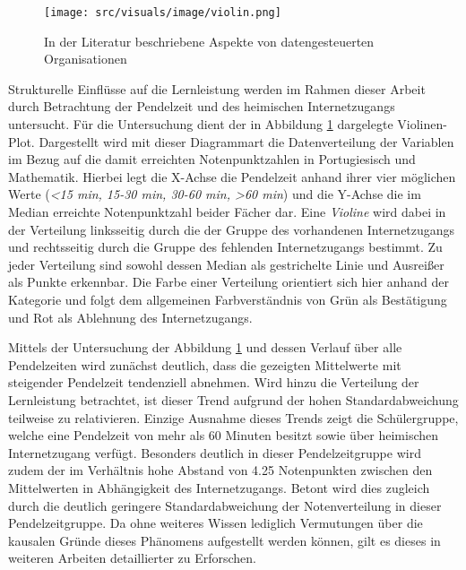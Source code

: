 \begin{figure}[htb]
    \centering
    \texttt{[image: src/visuals/image/violin.png]}
    \caption{In der Literatur beschriebene Aspekte von datengesteuerten Organisationen}
    \label{fig:violin}
\end{figure}

Strukturelle Einflüsse auf die Lernleistung werden im Rahmen dieser Arbeit durch Betrachtung der Pendelzeit und des heimischen Internetzugangs untersucht.
Für die Untersuchung dient der in Abbildung \ref{fig:violin} dargelegte Violinen-Plot.
Dargestellt wird mit dieser Diagrammart die Datenverteilung der Variablen im Bezug auf die damit erreichten Notenpunktzahlen in Portugiesisch und Mathematik.
Hierbei legt die X-Achse die Pendelzeit anhand ihrer vier möglichen Werte (\textit{<15 min, 15-30 min, 30-60 min, >60 min}) und die Y-Achse die im Median erreichte Notenpunktzahl beider Fächer dar.
Eine \textit{Violine} wird dabei in der Verteilung linksseitig durch die der Gruppe des vorhandenen Internetzugangs und rechtsseitig durch die Gruppe des fehlenden Internetzugangs bestimmt.
Zu jeder Verteilung sind sowohl dessen Median als gestrichelte Linie und Ausreißer als Punkte erkennbar.
Die Farbe einer Verteilung orientiert sich hier anhand der Kategorie und folgt dem allgemeinen Farbverständnis von Grün als Bestätigung und Rot als Ablehnung des Internetzugangs.

Mittels der Untersuchung der Abbildung \ref{fig:violin} und dessen Verlauf über alle Pendelzeiten wird zunächst deutlich, dass die gezeigten Mittelwerte mit steigender Pendelzeit tendenziell abnehmen. 
Wird hinzu die Verteilung der Lernleistung betrachtet, ist dieser Trend aufgrund der hohen Standardabweichung teilweise zu relativieren.
Einzige Ausnahme dieses Trends zeigt die Schülergruppe, welche eine Pendelzeit von mehr als 60 Minuten besitzt sowie über heimischen Internetzugang verfügt.
Besonders deutlich in dieser Pendelzeitgruppe wird zudem der im Verhältnis hohe Abstand von 4.25 Notenpunkten zwischen den Mittelwerten in Abhängigkeit des Internetzugangs.
Betont wird dies zugleich durch die deutlich geringere Standardabweichung der Notenverteilung in dieser Pendelzeitgruppe.
Da ohne weiteres Wissen lediglich Vermutungen über die kausalen Gründe dieses Phänomens aufgestellt werden können, gilt es dieses in weiteren Arbeiten detaillierter zu Erforschen.


